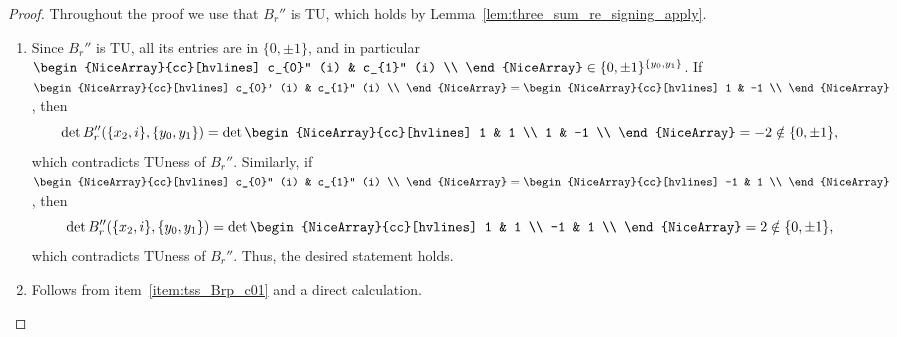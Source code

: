 \begin{proof}
    Throughout the proof we use that $B_{r}''$ is TU, which holds by Lemma~\ref{lem:three_sum_re_signing_apply}.

    \begin{enumerate}
        \item Since $B_{r}''$ is TU, all its entries are in $\{0, \pm 1\}$, and in particular $\begin{NiceArray}{cc}[hvlines] c_{0}'' (i) & c_{1}'' (i) \\ \end{NiceArray} \in \{0, \pm 1\}^{\{y_{0}, y_{1}\}}$. If $\begin{NiceArray}{cc}[hvlines] c_{0}' (i) & c_{1}'' (i) \\ \end{NiceArray} = \begin{NiceArray}{cc}[hvlines] 1 & -1 \\ \end{NiceArray}$, then
        \[
            \det B_{r}'' (\{x_{2}, i\}, \{y_{0}, y_{1}\}) = \det \begin{NiceArray}{cc}[hvlines] 1 & 1 \\ 1 & -1 \\ \end{NiceArray} = -2 \notin \{0, \pm 1\},
        \]
        which contradicts TUness of $B_{r}''$. Similarly, if $\begin{NiceArray}{cc}[hvlines] c_{0}'' (i) & c_{1}'' (i) \\ \end{NiceArray} = \begin{NiceArray}{cc}[hvlines] -1 & 1 \\ \end{NiceArray} $, then
        \[
            \det B_{r}'' (\{x_{2}, i\}, \{y_{0}, y_{1}\}) = \det \begin{NiceArray}{cc}[hvlines] 1 & 1 \\ -1 & 1 \\ \end{NiceArray} = 2 \notin \{0, \pm 1\},
        \]
        which contradicts TUness of $B_{r}''$. Thus, the desired statement holds.

        \item Follows from item~\ref{item:tss_Brp_c01} and a direct calculation.


\end{enumerate}
\end{proof}
